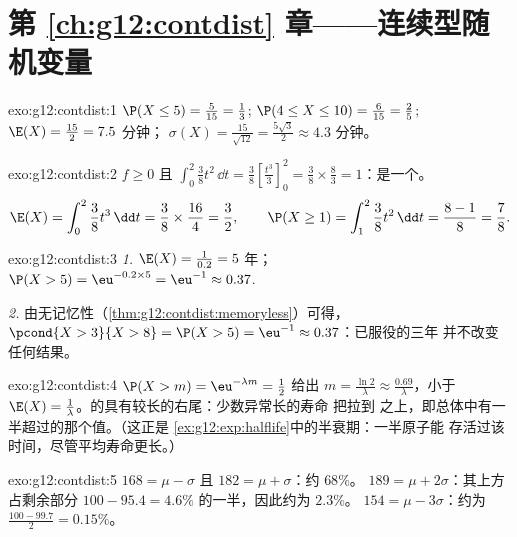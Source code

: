 \section*{第 \ref{ch:g12:contdist} 章——连续型随机变量}

\begin{solution}{exo:g12:contdist:1}
$\P(X \leq 5) = \frac{5}{15} = \frac13$;
$\P(4 \leq X \leq 10) = \frac{6}{15} = \frac25$;
$\E(X) = \frac{15}{2} = 7.5$ 分钟；
$\sigma(X) = \frac{15}{\sqrt{12}} = \frac{5\sqrt3}{2} \approx 4.3$ 分钟。
\end{solution}

\begin{solution}{exo:g12:contdist:2}
$f \geq 0$ 且
$\int_0^2 \frac38 t^2\,\dd t = \frac38\left[\frac{t^3}{3}\right]_0^2
= \frac38 \times \frac83 = 1$：是一个。
\[
\E(X) = \int_0^2 \frac38 t^3\,\dd t = \frac38 \times \frac{16}{4} = \frac32,
\qquad
\P(X \geq 1) = \int_1^2 \frac38 t^2\,\dd t = \frac{8 - 1}{8} = \frac78 .
\]
\end{solution}

\begin{solution}{exo:g12:contdist:3}
\emph{1.} $\E(X) = \frac{1}{0.2} = 5$ 年；
$\P(X > 5) = \eu^{-0.2\times5} = \eu^{-1} \approx 0.37$.

\emph{2.} 由无记忆性（\cref{thm:g12:contdist:memoryless}）可得，
$\pcond{X > 3}{X > 8} = \P(X > 5) = \eu^{-1} \approx 0.37$：已服役的三年
并不改变任何结果。
\end{solution}

\begin{solution}{exo:g12:contdist:4}
$\P(X > m) = \eu^{-\lambda m} = \frac12$ 给出
$m = \frac{\ln 2}{\lambda} \approx \frac{0.69}{\lambda}$，小于
$\E(X) = \frac1\lambda$。的具有较长的右尾：少数异常长的寿命
把\emph{}拉到
\emph{}之上，即总体中有一半超过的那个值。（这正是
\cref{ex:g12:exp:halflife}中的半衰期：一半原子能
存活过该时间，尽管平均寿命更长。）
\end{solution}

\begin{solution}{exo:g12:contdist:5}
$168 = \mu - \sigma$ 且 $182 = \mu + \sigma$：约 $68\%$。
$189 = \mu + 2\sigma$：其上方占剩余部分
$100 - 95.4 = 4.6\%$ 的一半，因此约为 $2.3\%$。
$154 = \mu - 3\sigma$：约为 $\frac{100 - 99.7}{2} = 0.15\%$。
\end{solution}


